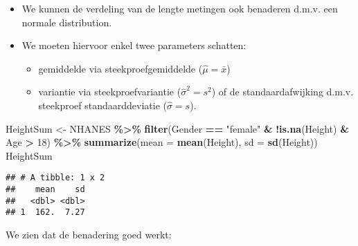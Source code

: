 \documentclass[
  12pt,dutch,coursenotes]{book}
\newenvironment{Shaded}{\begin{snugshade}}{\end{snugshade}}
\newcommand{\DataTypeTok}[1]{\textcolor[rgb]{0.13,0.29,0.53}{#1}}
\newcommand{\DecValTok}[1]{\textcolor[rgb]{0.00,0.00,0.81}{#1}}
\newcommand{\KeywordTok}[1]{\textcolor[rgb]{0.13,0.29,0.53}{\textbf{#1}}}
\newcommand{\NormalTok}[1]{#1}
\newcommand{\OperatorTok}[1]{\textcolor[rgb]{0.81,0.36,0.00}{\textbf{#1}}}
\newcommand{\StringTok}[1]{\textcolor[rgb]{0.31,0.60,0.02}{#1}}
\providecommand{\tightlist}{%
  \setlength{\itemsep}{0pt}\setlength{\parskip}{0pt}}
\theoremstyle{definition}
\theoremstyle{definition}
\theoremstyle{definition}
\theoremstyle{remark}
\begin{document}
\begin{itemize}
\item
  We kunnen de verdeling van de lengte metingen ook benaderen d.m.v. een normale distribution.
\item
  We moeten hiervoor enkel twee parameters schatten:

  \begin{itemize}
  \tightlist
  \item
    gemiddelde via steekproefgemiddelde (\(\hat\mu=\bar x\))
  \item
    variantie via steekproefvariantie (\(\hat{\sigma}^2= s^2\)) of de standaardafwijking d.m.v. steekproef standaarddeviatie (\(\hat\sigma=s\)).
  \end{itemize}
\end{itemize}

\begin{Shaded}
\begin{Highlighting}[]
\NormalTok{HeightSum \textless{}{-}}\StringTok{ }\NormalTok{NHANES }\OperatorTok{\%\textgreater{}\%}\StringTok{ }\KeywordTok{filter}\NormalTok{(Gender }\OperatorTok{==}\StringTok{ "female"} \OperatorTok{\&}\StringTok{ }
\StringTok{    }\OperatorTok{!}\KeywordTok{is.na}\NormalTok{(Height) }\OperatorTok{\&}\StringTok{ }\NormalTok{Age }\OperatorTok{\textgreater{}}\StringTok{ }\DecValTok{18}\NormalTok{) }\OperatorTok{\%\textgreater{}\%}\StringTok{ }\KeywordTok{summarize}\NormalTok{(}\DataTypeTok{mean =} \KeywordTok{mean}\NormalTok{(Height), }
    \DataTypeTok{sd =} \KeywordTok{sd}\NormalTok{(Height))}
\NormalTok{HeightSum}
\end{Highlighting}
\end{Shaded}

\begin{verbatim}
## # A tibble: 1 x 2
##    mean    sd
##   <dbl> <dbl>
## 1  162.  7.27
\end{verbatim}

We zien dat de benadering goed werkt:
\end{document}
